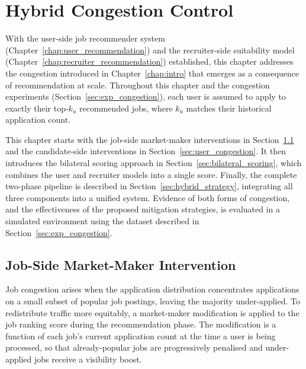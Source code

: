 \chapter{Hybrid Congestion Control}
\label{chap:congestion_balancing}
With the user-side job recommender system 
(Chapter~\ref{chap:user_recommendation}) and the recruiter-side 
suitability model (Chapter~\ref{chap:recruiter_recommendation}) 
established, this chapter addresses the congestion introduced in 
Chapter~\ref{chap:intro} that emerges as a consequence of 
recommendation at scale. Throughout this chapter and the congestion 
experiments (Section~\ref{sec:exp_congestion}), each user is assumed 
to apply to exactly their top-$k_u$ recommended jobs, where $k_u$ 
matches their historical application count.

This chapter starts with the job-side market-maker interventions in
Section~\ref{sec:job_congestion} and the candidate-side interventions in
Section~\ref{sec:user_congestion}. It then introduces the bilateral
scoring approach in Section~\ref{sec:bilateral_scoring}, which combines
the user and recruiter models into a single score. Finally, the complete
two-phase pipeline is described in Section~\ref{sec:hybrid_strategy},
integrating all three components into a unified system. Evidence of both
forms of congestion, and the effectiveness of the proposed mitigation
strategies, is evaluated in a simulated environment using the dataset
described in Section~\ref{sec:exp_congestion}.
\section{Job-Side Market-Maker Intervention}
\label{sec:job_congestion}

Job congestion arises when the application distribution concentrates applications on a small subset of popular job postings, leaving the majority under-applied. To redistribute traffic more equitably, a market-maker modification is applied to the job ranking score during the recommendation phase. The modification is a function of each job's current application count at the time a user is being processed, so that already-popular jobs are progressively penalised and under-applied jobs receive a visibility boost.

